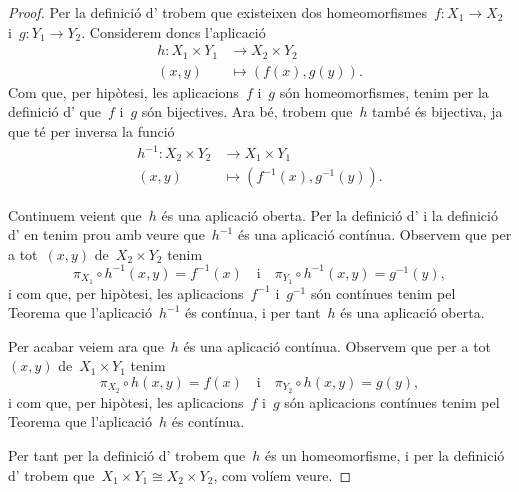 \documentclass[../../main.tex]{subfiles}
\begin{document}
    \begin{proof}
        Per la definició d' trobem que existeixen dos homeomorfismes~\(f\colon X_{1}\longrightarrow X_{2}\) i~\(g\colon Y_{1}\longrightarrow Y_{2}\).
        Considerem doncs l'aplicació
        \begin{align*}
            h\colon X_{1}\times Y_{1}&\longrightarrow X_{2}\times Y_{2} \\
            (x,y)&\longmapsto(f(x),g(y)).
        \end{align*}
        Com que, per hipòtesi, les aplicacions~\(f\) i~\(g\) són homeomorfismes, tenim per la definició d' que~\(f\) i~\(g\) són bijectives.
        Ara bé, trobem que~\(h\) també és bijectiva, ja que té per inversa la funció
        \begin{align*}
            h^{-1}\colon X_{2}\times Y_{2}&\longrightarrow X_{1}\times Y_{1} \\
            (x,y)&\longmapsto(f^{-1}(x),g^{-1}(y)).
        \end{align*}

        Continuem veient que~\(h\) és una aplicació oberta.
        Per la definició d' i la definició d' en tenim prou amb veure que~\(h^{-1}\) és una aplicació contínua.
        Observem que per a tot~\((x,y)\) de~\(X_{2}\times Y_{2}\) tenim
        \[
            \pi_{X_{1}}\circ h^{-1}(x,y)=f^{-1}(x)\quad\text{i}\quad\pi_{Y_{1}}\circ h^{-1}(x,y)=g^{-1}(y),
        \]
        i com que, per hipòtesi, les aplicacions~\(f^{-1}\) i~\(g^{-1}\) són contínues tenim pel Teorema  que l'aplicació~\(h^{-1}\) és contínua, i per tant~\(h\) és una aplicació oberta.

        Per acabar veiem ara que~\(h\) és una aplicació contínua.
        Observem que per a tot~\((x,y)\) de~\(X_{1}\times Y_{1}\) tenim
        \[
            \pi_{X_{2}}\circ h(x,y)=f(x)\quad\text{i}\quad\pi_{Y_{2}}\circ h(x,y)=g(y),
        \]
        i com que, per hipòtesi, les aplicacions~\(f\) i~\(g\) són aplicacions contínues tenim pel Teorema  que l'aplicació~\(h\) és contínua.

        Per tant per la definició d' trobem que~\(h\) és un homeomorfisme, i per la definició d' trobem que~\(X_{1}\times Y_{1}\cong X_{2}\times Y_{2}\), com volíem veure.
    \end{proof}
\end{document}
